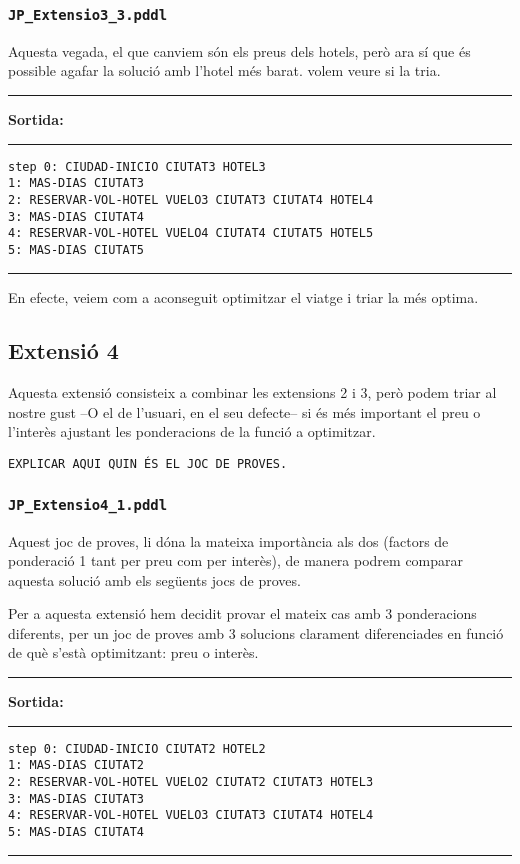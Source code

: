 \documentclass[11pt,a4paper]{article}
\begin{document}
\subsubsection*{\texttt{JP\_Extensio3\_3.pddl}}

Aquesta vegada, el que canviem són els preus dels hotels, però ara sí que és possible agafar la solució amb l'hotel més barat. volem veure si la tria.

\begin{samepage}
\medskip
\noindent
\rule{0.1\textwidth}{0.5mm}
\textbf{Sortida:}
\rule{0.76\textwidth}{0.5mm}
\begin{verbatim}
step 0: CIUDAD-INICIO CIUTAT3 HOTEL3
1: MAS-DIAS CIUTAT3
2: RESERVAR-VOL-HOTEL VUELO3 CIUTAT3 CIUTAT4 HOTEL4
3: MAS-DIAS CIUTAT4
4: RESERVAR-VOL-HOTEL VUELO4 CIUTAT4 CIUTAT5 HOTEL5
5: MAS-DIAS CIUTAT5
\end{verbatim}
\rule{\textwidth}{0.5mm}
\medskip
\end{samepage}

En efecte, veiem com a aconseguit optimitzar el viatge i triar la més optima.

\subsection{Extensió 4}

Aquesta extensió consisteix a combinar les extensions 2 i 3, però podem triar al nostre gust --O el de l'usuari, en el seu defecte-- si és més important el preu o l'interès ajustant les ponderacions de la funció a optimitzar.

\begin{verbatim}
EXPLICAR AQUI QUIN ÉS EL JOC DE PROVES.
\end{verbatim}

\subsubsection*{\texttt{JP\_Extensio4\_1.pddl}}

Aquest joc de proves, li dóna la mateixa importància als dos (factors de ponderació 1 tant per preu com per interès), de manera podrem comparar aquesta solució amb els següents jocs de proves.

Per a aquesta extensió hem decidit provar el mateix cas amb 3 ponderacions diferents, per un joc de proves amb 3 solucions clarament diferenciades en funció de què s'està optimitzant: preu  o interès.

\begin{samepage}
\medskip
\noindent
\rule{0.1\textwidth}{0.5mm}
\textbf{Sortida:}
\rule{0.76\textwidth}{0.5mm}
\begin{verbatim}
step 0: CIUDAD-INICIO CIUTAT2 HOTEL2
1: MAS-DIAS CIUTAT2
2: RESERVAR-VOL-HOTEL VUELO2 CIUTAT2 CIUTAT3 HOTEL3
3: MAS-DIAS CIUTAT3
4: RESERVAR-VOL-HOTEL VUELO3 CIUTAT3 CIUTAT4 HOTEL4
5: MAS-DIAS CIUTAT4
\end{verbatim}
\rule{\textwidth}{0.5mm}
\medskip
\end{samepage}
\end{document}
